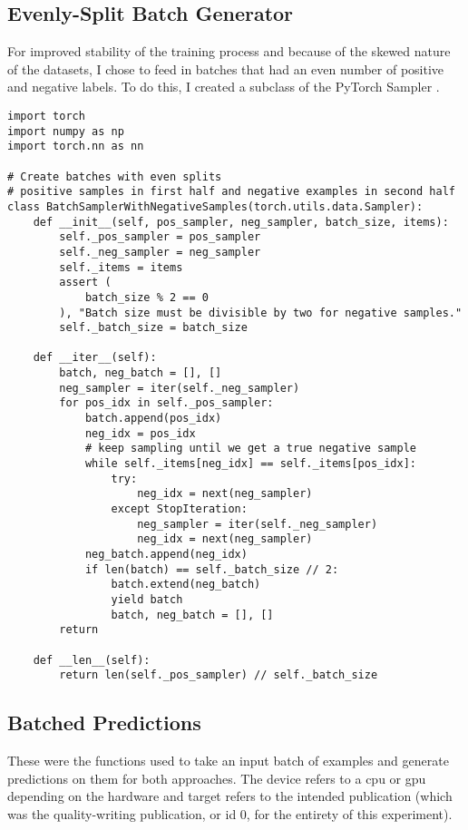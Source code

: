 \subsection{Evenly-Split Batch Generator}
For improved stability of the training process and because of the skewed nature of the datasets, I chose to feed in batches that had an even number of positive and negative labels. To do this, I created a subclass of the PyTorch Sampler \parencite{NEURIPS2019_9015}.

\begin{verbatim}
import torch
import numpy as np
import torch.nn as nn

# Create batches with even splits
# positive samples in first half and negative examples in second half
class BatchSamplerWithNegativeSamples(torch.utils.data.Sampler):
    def __init__(self, pos_sampler, neg_sampler, batch_size, items):
        self._pos_sampler = pos_sampler
        self._neg_sampler = neg_sampler
        self._items = items
        assert (
            batch_size % 2 == 0
        ), "Batch size must be divisible by two for negative samples."
        self._batch_size = batch_size

    def __iter__(self):
        batch, neg_batch = [], []
        neg_sampler = iter(self._neg_sampler)
        for pos_idx in self._pos_sampler:
            batch.append(pos_idx)
            neg_idx = pos_idx
            # keep sampling until we get a true negative sample
            while self._items[neg_idx] == self._items[pos_idx]:
                try:
                    neg_idx = next(neg_sampler)
                except StopIteration:
                    neg_sampler = iter(self._neg_sampler)
                    neg_idx = next(neg_sampler)
            neg_batch.append(neg_idx)
            if len(batch) == self._batch_size // 2:
                batch.extend(neg_batch)
                yield batch
                batch, neg_batch = [], []
        return

    def __len__(self):
        return len(self._pos_sampler) // self._batch_size

\end{verbatim}

\subsection{Batched Predictions}
These were the functions used to take an input batch of examples and generate predictions on them for both approaches. The device refers to a cpu or gpu depending on the hardware and target refers to the intended publication (which was the quality-writing publication, or id 0, for the entirety of this experiment).

